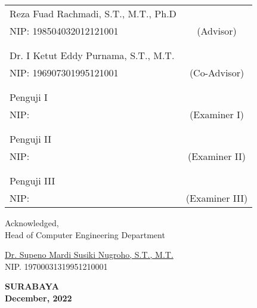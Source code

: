 \noindent
\begin{tabularx}{\textwidth}{X c}
  Reza Fuad Rachmadi, S.T., M.T., Ph.D &                \\
  NIP: 198504032012121001              & (Advisor)      \\
                                       &                \\
                                       &                \\
  Dr. I Ketut Eddy Purnama, S.T., M.T. &                \\
  NIP: 196907301995121001              & (Co-Advisor)   \\
                                       &                \\
                                       &                \\
  Penguji I                            &                \\
  NIP:                                 & (Examiner I)   \\
                                       &                \\
                                       &                \\
  Penguji II                           &                \\
  NIP:                                 & (Examiner II)  \\
                                       &                \\
                                       &                \\
  Penguji III                          &                \\
  NIP:                                 & (Examiner III) \\
\end{tabularx}
\endgroup

\vspace{2ex}

\begin{center}
  Acknowledged, \\
  Head of Computer Engineering Department\\

  \vspace{10ex}

  \underline{Dr. Supeno Mardi Susiki Nugroho, S.T., M.T.} \\
  NIP. 19700031319951210001
\end{center}

\vfill

\begin{center}
  \textbf{SURABAYA} \\
  \textbf{December, 2022}
\end{center}
\endgroup

